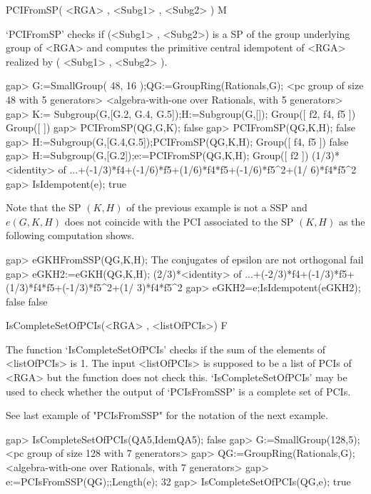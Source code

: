 \>PCIFromSP( <RGA> , <Subg1> , <Subg2> ) M


`PCIFromSP' checks if (<Subg1> , <Subg2>) is a SP of the group underlying 
group of <RGA> and computes the primitive central idempotent of <RGA> 
realized by ( <Subg1> , <Subg2> ). 

\beginexample
    gap> G:=SmallGroup( 48, 16 );QG:=GroupRing(Rationals,G);
    <pc group of size 48 with 5 generators>
    <algebra-with-one over Rationals, with 5 generators>
    gap> K:= Subgroup(G,[G.2, G.4, G.5]);H:=Subgroup(G,[]);
    Group([ f2, f4, f5 ])
    Group([  ])
    gap> PCIFromSP(QG,G,K);
    false
    gap> PCIFromSP(QG,K,H);
    false
    gap> H:=Subgroup(G,[G.4,G.5]);PCIFromSP(QG,K,H);
    Group([ f4, f5 ])
    false
    gap> H:=Subgroup(G,[G.2]);e:=PCIFromSP(QG,K,H);
    Group([ f2 ])
    (1/3)*<identity> of ...+(-1/3)*f4+(-1/6)*f5+(1/6)*f4*f5+(-1/6)*f5^2+(1/
    6)*f4*f5^2
    gap> IsIdempotent(e);
    true
\endexample

Note that the SP $(K,H)$ of the previous example is not a SSP and 
$e(G,K,H)$ does not coincide with the PCI associated to the SP $(K,H)$ as 
the following computation shows. 

\beginexample
    gap> eGKHFromSSP(QG,K,H);
    The conjugates of epsilon are not orthogonal
    fail
    gap> eGKH2:=eGKH(QG,K,H); 
    (2/3)*<identity> of ...+(-2/3)*f4+(-1/3)*f5+(1/3)*f4*f5+(-1/3)*f5^2+(1/
    3)*f4*f5^2
    gap> eGKH2=e;IsIdempotent(eGKH2);
    false
    false
\endexample


\>IsCompleteSetOfPCIs(<RGA> , <listOfPCIs>) F 

The function `IsCompleteSetOfPCIs' checks if the sum of the elements of <listOfPCIs> 
is 1. The input <listOfPCIs> is supposed to be a list of PCIs of <RGA> but the 
function does not check this. `IsCompleteSetOfPCIs' may be used to check 
whether the 
output of `PCIsFromSSP' is a complete set of PCIs. 

See last example of "PCIsFromSSP" for the notation of the next example. 

\beginexample
    gap> IsCompleteSetOfPCIs(QA5,IdemQA5); 
    false
    gap> G:=SmallGroup(128,5);
    <pc group of size 128 with 7 generators>
    gap> QG:=GroupRing(Rationals,G);
    <algebra-with-one over Rationals, with 7 generators>
    gap> e:=PCIsFromSSP(QG);;Length(e);
    32
    gap> IsCompleteSetOfPCIs(QG,e);
    true
\endexample
